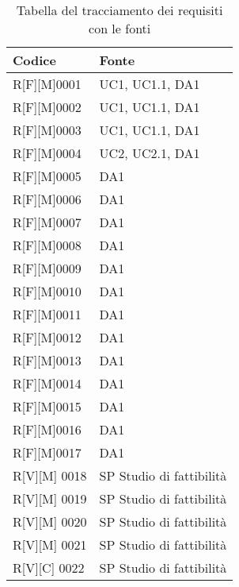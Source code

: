         \begin{center}
            \begin{longtable}{|p{3cm}|p{3cm}|}%
            \caption{Tabella del tracciamento dei requisiti con le fonti}
            \label{tab:requisiti-fonte-sp}
            \endfirsthead
            \endhead
            \hline
            \textbf{Codice}  & \textbf{Fonte}\\
            \hline
            R[F][M]0001    & UC1, UC1.1, DA1  \\
            \hline
            R[F][M]0002    & UC1, UC1.1, DA1  \\
            \hline
            R[F][M]0003    & UC1, UC1.1, DA1  \\
            \hline
            R[F][M]0004    & UC2, UC2.1, DA1  \\
            \hline
            R[F][M]0005    & DA1  \\
            \hline
            R[F][M]0006    & DA1  \\
            \hline
            R[F][M]0007    & DA1  \\
            \hline
            R[F][M]0008    & DA1  \\
            \hline
            R[F][M]0009    & DA1  \\
            \hline
            R[F][M]0010    & DA1  \\
            \hline
            R[F][M]0011    & DA1  \\
            \hline
            R[F][M]0012    & DA1  \\
            \hline
            R[F][M]0013    & DA1  \\
            \hline
            R[F][M]0014    & DA1  \\
            \hline
            R[F][M]0015    & DA1  \\
            \hline
            R[F][M]0016    & DA1  \\
            \hline
            R[F][M]0017    & DA1  \\
            \hline
            R[V][M] 0018    & SP Studio di fattibilità  \\
            \hline
            R[V][M] 0019    & SP Studio di fattibilità  \\
            \hline
            R[V][M] 0020    & SP Studio di fattibilità  \\
            \hline
            R[V][M] 0021    & SP Studio di fattibilità  \\
            \hline
            R[V][C] 0022    & SP Studio di fattibilità  \\

\end{longtable}
\end{center}
